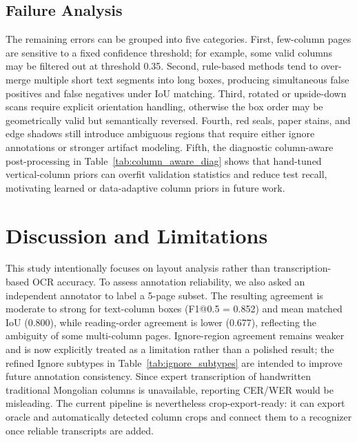 \documentclass[pdflatex,sn-mathphys-num]{sn-jnl}
\begin{document}
\subsection{Failure Analysis}
The remaining errors can be grouped into five categories. First, few-column pages are sensitive to a fixed confidence threshold; for example, some valid columns may be filtered out at threshold 0.35. Second, rule-based methods tend to over-merge multiple short text segments into long boxes, producing simultaneous false positives and false negatives under IoU matching. Third, rotated or upside-down scans require explicit orientation handling, otherwise the box order may be geometrically valid but semantically reversed. Fourth, red seals, paper stains, and edge shadows still introduce ambiguous regions that require either ignore annotations or stronger artifact modeling. Fifth, the diagnostic column-aware post-processing in Table~\ref{tab:column_aware_diag} shows that hand-tuned vertical-column priors can overfit validation statistics and reduce test recall, motivating learned or data-adaptive column priors in future work.

\section{Discussion and Limitations}
\label{sec:discussion}
This study intentionally focuses on layout analysis rather than transcription-based OCR accuracy. To assess annotation reliability, we also asked an independent annotator to label a 5-page subset. The resulting agreement is moderate to strong for text-column boxes (F1@0.5 = 0.852) and mean matched IoU (0.800), while reading-order agreement is lower (0.677), reflecting the ambiguity of some multi-column pages. Ignore-region agreement remains weaker and is now explicitly treated as a limitation rather than a polished result; the refined Ignore subtypes in Table~\ref{tab:ignore_subtypes} are intended to improve future annotation consistency. Since expert transcription of handwritten traditional Mongolian columns is unavailable, reporting CER/WER would be misleading. The current pipeline is nevertheless crop-export-ready: it can export oracle and automatically detected column crops and connect them to a recognizer once reliable transcripts are added.
\end{document}
